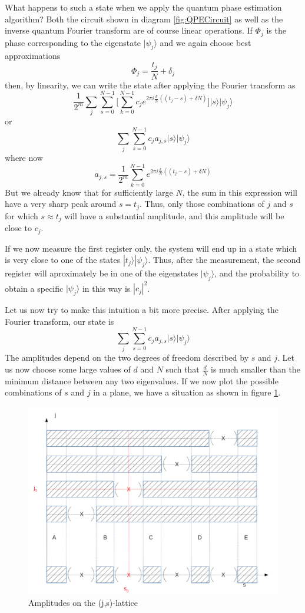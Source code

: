 \documentclass[a4paper, draft]{article}
\theoremstyle{own}
\theoremstyle{remark}
\begin{document}
What happens to such a state when we apply the quantum phase estimation algorithm? Both the circuit shown in diagram \ref{fig:QPECircuit} as well as the inverse quantum Fourier transform are of course linear operations. If $\Phi_j$ is the phase corresponding to the eigenstate $|\psi_j \rangle$ and we again choose best approximations
$$
\Phi_j = \frac{t_j}{N} + \delta_j
$$
then, by linearity, we can write the state after applying the  Fourier transform as
$$
\frac{1}{2^m} \sum_j \sum_{s=0}^{N-1} 
\big[ \sum_{k=0}^{N-1} c_j e^{2\pi i \frac{k}{N}((t_j-s) + \delta N)}\big] |s \rangle |\psi_j \rangle
$$
or
$$
\sum_j \sum_{s=0}^{N-1} 
c_j a_{j,s} |s \rangle |\psi_j \rangle
$$
where now
$$
a_{j,s} = \frac{1}{2^m}   \sum_{k=0}^{N-1}  e^{2\pi i \frac{k}{N}((t_j-s) + \delta N)}
$$
But we already know that for sufficiently large $N$, the sum in this expression will have a very sharp peak around $s = t_j$. Thus, only those combinations of $j$ and $s$ for which $s \approx t_j$ will have a substantial amplitude, and this amplitude will be close to $c_j$. 

If we now measure the first register only, the system will end up in a state which is very close to one of the states $|t_j \rangle |\psi_j \rangle$. Thus, after the measurement, the second register will aproximately be in one of the eigenstates $|\psi_j \rangle$, and the probability to obtain a specific $|\psi_j \rangle$ in this way is $|c_j|^2$. 


Let us now try to make this intuition a bit more precise. After applying the Fourier transform, our state is
$$
\sum_j \sum_{s=0}^{N-1} 
c_j a_{j,s} |s \rangle |\psi_j \rangle
$$
The amplitudes depend on the two degrees of freedom described by $s$ and $j$. Let us now choose some large values of $d$ and $N$ such that $\frac{d}{N}$ is much smaller than the minimum distance between any two eigenvalues. If we now plot the possible combinations of $s$ and $j$ in a plane, we have a situation as shown in figure \ref{fig:QPEigenstates}.

\begin{figure}[ht]
\centering
\includegraphics[width=0.7\linewidth]{images/QPEigenstates}
\caption[Amplitudes on the (j,s)-lattice]{Amplitudes on the (j,s)-lattice}
\label{fig:QPEigenstates}
\end{figure}
\end{document}
